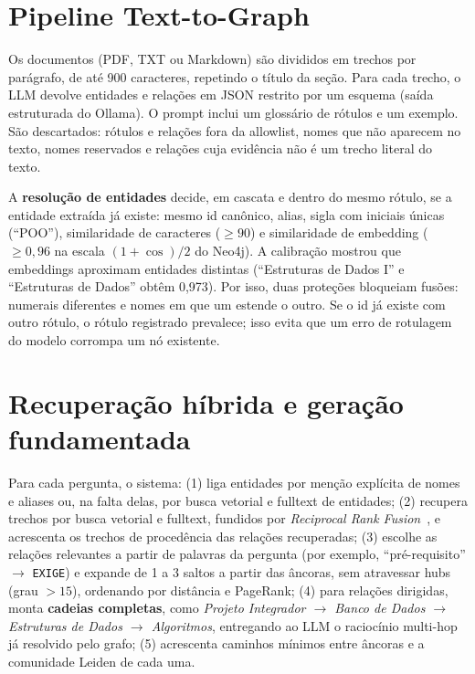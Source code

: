 \documentclass[12pt]{article}
\begin{document}
\section{Pipeline Text-to-Graph}

Os documentos (PDF, TXT ou Markdown) são divididos em trechos por parágrafo, de até 900
caracteres, repetindo o título da seção. Para cada trecho, o LLM devolve entidades e
relações em JSON restrito por um esquema (saída estruturada do Ollama). O prompt inclui um
glossário de rótulos e um exemplo. São descartados: rótulos e relações fora da allowlist,
nomes que não aparecem no texto, nomes reservados e relações cuja evidência não é um
trecho literal do texto.

A \textbf{resolução de entidades} decide, em cascata e dentro do mesmo rótulo, se a
entidade extraída já existe: mesmo id canônico, alias, sigla com iniciais únicas
(``POO''), similaridade de caracteres ($\geq 90$) e similaridade de embedding
($\geq 0{,}96$ na escala $(1+\cos)/2$ do Neo4j). A calibração mostrou que embeddings
aproximam entidades distintas (``Estruturas de Dados I'' e ``Estruturas de Dados''
obtêm 0,973). Por isso, duas proteções bloqueiam fusões: numerais diferentes e nomes em
que um estende o outro. Se o id já existe com outro rótulo, o rótulo registrado
prevalece; isso evita que um erro de rotulagem do modelo corrompa um nó existente.

\section{Recuperação híbrida e geração fundamentada}

Para cada pergunta, o sistema: (1) liga entidades por menção explícita de nomes e
aliases ou, na falta delas, por busca vetorial e fulltext de entidades; (2) recupera
trechos por busca vetorial e fulltext, fundidos por \emph{Reciprocal Rank
Fusion}~\cite{cormack2009rrf}, e acrescenta os trechos de procedência das relações
recuperadas; (3) escolhe as relações relevantes a partir de palavras da pergunta (por
exemplo, ``pré-requisito'' $\rightarrow$ \texttt{EXIGE}) e expande de 1 a 3 saltos a
partir das âncoras, sem atravessar hubs (grau $> 15$), ordenando por distância e
PageRank; (4) para relações dirigidas, monta \textbf{cadeias completas}, como
\textit{Projeto Integrador $\rightarrow$ Banco de Dados $\rightarrow$ Estruturas de Dados
$\rightarrow$ Algoritmos}, entregando ao LLM o raciocínio multi-hop já resolvido pelo
grafo; (5) acrescenta caminhos mínimos entre âncoras e a comunidade Leiden de cada uma.
\end{document}
